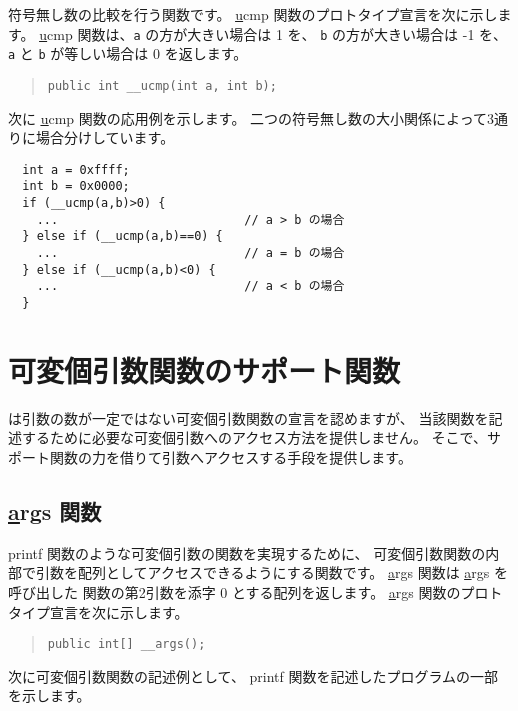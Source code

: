 符号無し数の比較を行う関数です。
\ul \ul ucmp 関数のプロトタイプ宣言を次に示します。
\ul \ul ucmp 関数は、\verb/a/ の方が大きい場合は 1 を、
\verb/b/ の方が大きい場合は -1 を、
\verb/a/ と \verb/b/ が等しい場合は 0 を返します。

\begin{quote}
\begin{verbatim}
public int __ucmp(int a, int b);
\end{verbatim}
\end{quote}

次に \ul \ul ucmp 関数の応用例を示します。
二つの符号無し数の大小関係によって3通りに場合分けしています。

\begin{mylist}
\begin{verbatim}
  int a = 0xffff;
  int b = 0x0000;
  if (__ucmp(a,b)>0) {
    ...                          // a > b の場合
  } else if (__ucmp(a,b)==0) {
    ...                          // a = b の場合
  } else if (__ucmp(a,b)<0) {
    ...                          // a < b の場合
  }
\end{verbatim}
\end{mylist}

\section{可変個引数関数のサポート関数}

\cmml は引数の数が一定ではない可変個引数関数の宣言を認めますが、
当該関数を記述するために必要な可変個引数へのアクセス方法を提供しません。
そこで、サポート関数の力を借りて引数へアクセスする手段を提供します。

\subsection{\ul \ul args 関数}
\label{chap4:args}

printf 関数のような可変個引数の関数を実現するために、
可変個引数関数の内部で引数を配列としてアクセスできるようにする関数です。
\ul \ul args 関数は \ul \ul args を呼び出した
\cmm 関数の第2引数を添字 0 とする配列を返します。
\ul \ul args 関数のプロトタイプ宣言を次に示します。

\begin{quote}
\begin{verbatim}
public int[] __args();
\end{verbatim}
\end{quote}

次に可変個引数関数の記述例として、
printf 関数を記述したプログラムの一部を示します。

